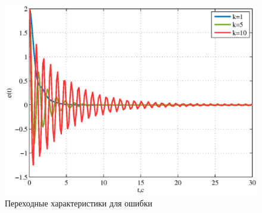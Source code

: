 \documentclass[a4paper,12pt]{article} %
\begin{document}
\begin{figure}[H]
	\centering
	\includegraphics[width=1\linewidth]{scheme/plot6.eps}
	\caption{Переходные характеристики для ошибки}
\end{figure}
\end{document}
